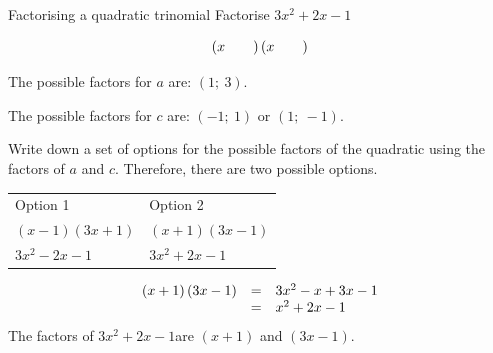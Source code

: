 \begin{wex}
{ 
Factorising a quadratic trinomial 
}
{
Factorise $3{x}^{2}+2x-1$ 
} 
{
\begin{equation*}
\left(x\phantom{\rule{2.em}{0ex}}\right)\left(x\phantom{\rule{2.em}{0ex}}\right)
\end{equation*}

The possible factors for $a$ are: $(1;~3)$.\par
The possible factors for $c$ are: $(-1;~1)$ or $(1;~-1)$.\par 
\label{m39394*id277075}Write down a set of options for the possible factors of the quadratic using the factors of $a$ and $c$.
Therefore, there are two possible options.\par 
\begin{table}[H]
\begin{center}
\label{m39394*id277097}
\noindent
{}
\tablelasttail{}
\begin{xtabular}[t]{|l|l|}\hline
Option 1 &
Option 2%
\tabularnewline{}
$\left(x-1\right)\left(3x+1\right)$
&
$\left(x+1\right)\left(3x-1\right)$
\tabularnewline{}
$3{x}^{2}-2x-1$
&
\uline{
$3{x}^{2}+2x-1$
}
\tabularnewline{}
\end{xtabular}
\end{center}
\end{table}

\label{m39394*id277257}\nopagebreak\noindent{}

\begin{equation*}
\begin{array}{ccl}  
\left(x+1\right)\left(3x-1\right)& =& 3{x}^{2}-x+3x-1\hfill \\ & =& {x}^{2}+2x-1\end{array}
\end{equation*}
\westep{}
\label{m39394*id277481}The factors of $3{x}^{2}+2x-1$\hspace{1ex}are $\left(x+1\right)$ and $\left(3x-1\right)$.

}
\end{wex}


